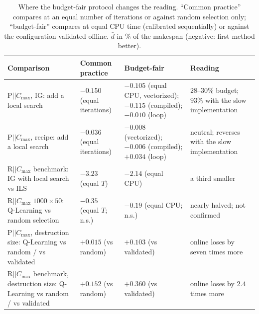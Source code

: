 \begin{table}[t]
\centering
\caption{Where the budget-fair protocol changes the reading. ``Common practice'' compares at an equal number of iterations or against random selection only; ``budget-fair'' compares at equal CPU time (calibrated
sequentially) or against the configuration validated offline. $\bar d$ in \% of the makespan (negative: first method better).}
\label{tab:fair_vs_naive}
{\scriptsize\setlength{\tabcolsep}{3pt}
\begin{tabular}{@{}p{}p{}p{}p{}@{}}
\toprule
Comparison & Common practice & Budget-fair & Reading \\
\midrule
P$||C_{\max}$, IG: add a local search & $-0.150$ (equal iterations) & $-0.105$ (equal CPU, vectorized); $-0.115$ (compiled); $-0.010$ (loop) & $28$--$30\%$ budget; $93\%$ with the slow implementation \\
P$||C_{\max}$, recipe: add a local search & $-0.036$ (equal iterations) & $-0.008$ (vectorized); $-0.006$ (compiled); $+0.034$ (loop) & neutral; reverses with the slow implementation \\
R$||C_{\max}$ benchmark: IG with local search vs ILS & $-3.23$ (equal $T$) & $-2.14$ (equal CPU) & a third smaller \\
R$||C_{\max}$ $1000\times50$: Q-Learning vs random selection & $-0.35$ (equal $T$; n.s.) & $-0.19$ (equal CPU; n.s.) & nearly halved; not confirmed \\
P$||C_{\max}$, destruction size: Q-Learning vs random / vs validated & $+0.015$ (vs random) & $+0.103$ (vs validated) & online loses by seven times more \\
R$||C_{\max}$ benchmark, destruction size: Q-Learning vs random / vs validated & $+0.152$ (vs random) & $+0.360$ (vs validated) & online loses by $2.4$ times more \\
\bottomrule
\end{tabular}}
\end{table}

